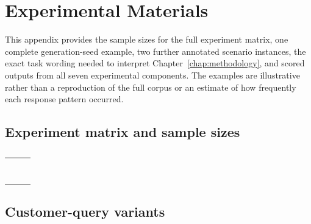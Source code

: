 \chapter{Experimental Materials}
\label{app:materials}

\begin{revisionblock}
This appendix provides the sample sizes for the full experiment matrix, one complete generation-seed example, two further annotated scenario instances, the exact task wording needed to interpret Chapter~\ref{chap:methodology}, and scored outputs from all seven experimental components. The examples are illustrative rather than a reproduction of the full corpus or an estimate of how frequently each response pattern occurred.
\end{revisionblock}

\section{Experiment matrix and sample sizes}
\begin{table}[htbp]
\centering
\caption{}
\label{app:experiment-sample-sizes}
\small
\begin{tabularx}{0.94\textwidth}{@{}Yrr@{}}
\toprule
{} &  &  \\
\midrule
{} &  &  \\
 &  &  \\
 &  &  \\
 &  &  \\
 &  &  \\
 &  &  \\
 &  &  \\
\midrule
{} & &  \\
\bottomrule
\end{tabularx}
\end{table}



\section{Customer-query variants}
\label{app:customer_query_variants}


